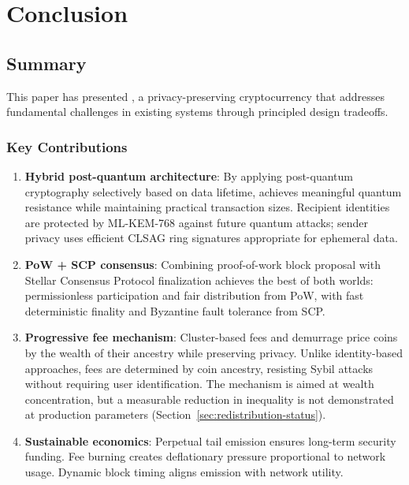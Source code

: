 
\section{Conclusion}
\label{sec:conclusion}

\subsection{Summary}

This paper has presented \Botho, a privacy-preserving cryptocurrency that
addresses fundamental challenges in existing systems through principled
design tradeoffs.

\subsubsection{Key Contributions}

\begin{enumerate}
  \item \textbf{Hybrid post-quantum architecture}: By applying post-quantum
    cryptography selectively based on data lifetime, \Botho achieves
    meaningful quantum resistance while maintaining practical transaction
    sizes. Recipient identities are protected by ML-KEM-768 against future
    quantum attacks; sender privacy uses efficient CLSAG ring signatures
    appropriate for ephemeral data.

  \item \textbf{PoW + SCP consensus}: Combining proof-of-work block proposal
    with Stellar Consensus Protocol finalization achieves the best of both
    worlds: permissionless participation and fair distribution from PoW,
    with fast deterministic finality and Byzantine fault tolerance from SCP.

  \item \textbf{Progressive fee mechanism}: Cluster-based fees and
    demurrage price coins by the wealth of their ancestry while preserving
    privacy. Unlike identity-based approaches, fees are determined by coin
    ancestry, resisting Sybil attacks without requiring user identification.
    The mechanism is aimed at wealth concentration, but a measurable
    reduction in inequality is not demonstrated at production parameters
    (Section~\ref{sec:redistribution-status}).

  \item \textbf{Sustainable economics}: Perpetual tail emission ensures
    long-term security funding. Fee burning creates deflationary pressure
    proportional to network usage. Dynamic block timing aligns emission
    with network utility.
\end{enumerate}

